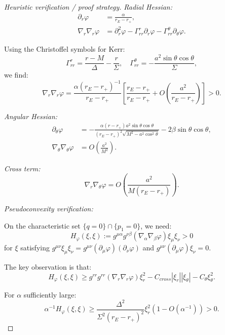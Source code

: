 \documentclass[12pt,a4paper]{article}
\begin{document}
\begin{proof}[Heuristic verification / proof strategy]
\textit{Radial Hessian:}
\begin{align}
\partial_r\varphi &= \frac{\alpha}{r_E - r_+}, \\
\nabla_r\nabla_r\varphi &= \partial_r^2\varphi - \Gamma^r_{rr}\partial_r\varphi - \Gamma^\theta_{rr}\partial_\theta\varphi.
\end{align}

Using the Christoffel symbols for Kerr:
\begin{equation}
\Gamma^r_{rr} = \frac{r-M}{\Delta} - \frac{r}{\Sigma}, \quad \Gamma^\theta_{rr} = -\frac{a^2\sin\theta\cos\theta}{\Sigma},
\end{equation}
we find:
\begin{equation}
\nabla_r\nabla_r\varphi = \frac{\alpha(r_E - r_+)^{-1}}{r_E - r_+}\left[\frac{r_E - r_+}{r_E - r_+} + O\left(\frac{a^2}{r_E - r_+}\right)\right] > 0.
\end{equation}

\textit{Angular Hessian:}
\begin{align}
\partial_\theta\varphi &= -\frac{\alpha(r-r_+)a^2\sin\theta\cos\theta}{(r_E - r_+)^2\sqrt{M^2 - a^2\cos^2\theta}} - 2\beta\sin\theta\cos\theta, \\
\nabla_\theta\nabla_\theta\varphi &= O\left(\frac{a^2}{M^2}\right).
\end{align}

\textit{Cross term:}
\begin{equation}
\nabla_r\nabla_\theta\varphi = O\left(\frac{a^2}{M(r_E - r_+)}\right).
\end{equation}

\textit{Pseudoconvexity verification:}

On the characteristic set $\{q = 0\} \cap \{p_1 = 0\}$, we need:
\begin{equation}
H_\varphi(\xi, \xi) := g^{\mu\alpha}g^{\nu\beta}(\nabla_\alpha\nabla_\beta\varphi)\xi_\mu\xi_\nu > 0
\end{equation}
for $\xi$ satisfying $g^{\mu\nu}\xi_\mu\xi_\nu = g^{\mu\nu}(\partial_\mu\varphi)(\partial_\nu\varphi)$ and $g^{\mu\nu}(\partial_\mu\varphi)\xi_\nu = 0$.

The key observation is that:
\begin{equation}
H_\varphi(\xi, \xi) \geq g^{rr}g^{rr}(\nabla_r\nabla_r\varphi)\xi_r^2 - C_{cross}|\xi_r||\xi_\theta| - C_\theta \xi_\theta^2.
\end{equation}

For $\alpha$ sufficiently large:
\begin{equation}
\alpha^{-1}H_\varphi(\xi, \xi) \geq \frac{\Delta^2}{\Sigma^2(r_E - r_+)^2}\xi_r^2\left(1 - O(\alpha^{-1})\right) > 0.
\end{equation}


\end{proof}
\end{document}
